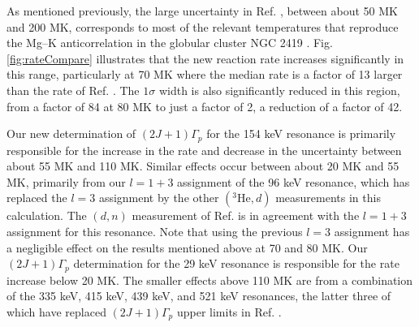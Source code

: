 As mentioned previously, the large uncertainty in Ref. \cite{Longland2018}, between about 50 MK and 200 MK, corresponds to most of the relevant temperatures that reproduce the Mg--K anticorrelation in the globular cluster NGC 2419 \cite{Iliadis2016}. 
Fig. \ref{fig:rateCompare} illustrates that the new reaction rate increases significantly in this range, particularly at 70 MK where the median rate is a factor of 13 larger than the rate of Ref. \cite{Longland2018}. The $1\sigma$ width is also significantly reduced in this region, from a factor of 84 at 80 MK to just a factor of 2, a reduction of a factor of 42.

Our new determination of $(2J+1)\Gamma_{p}$ for the 154 keV resonance is primarily responsible for the increase in the rate and decrease in the uncertainty between about 55 MK and 110 MK. Similar effects occur between about 20 MK and 55 MK, primarily from our $l=1+3$ assignment of the 96 keV resonance, which has replaced the $l=3$ assignment by the other $(^{3}\mathrm{He}, d)$ measurements in this calculation. The $(d,n)$ measurement of Ref. \cite{Fuchs1969} is in agreement with the $l=1+3$ assignment for this resonance. Note that using the previous $l=3$ assignment has a negligible effect on the results mentioned above at 70 and 80 MK. Our $(2J+1)\Gamma_{p}$ determination for the 29 keV resonance is responsible for the rate increase below 20 MK. The smaller effects above 110 MK are from a combination of the 335 keV, 415 keV, 439 keV, and 521 keV resonances, the latter three of which have replaced $(2J+1)\Gamma_{p}$ upper limits in Ref. \cite{Longland2018}.

